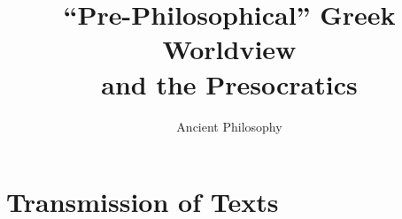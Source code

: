 \documentclass[11pt]{article}
\begin{document}
\author{Ancient Philosophy}
\title{``Pre-Philosophical'' Greek Worldview\\ and the Presocratics}
\maketitle
\thispagestyle{empty}\vspace*{3mm}

\section*{\textbf{Transmission of Texts}}
\end{document}
